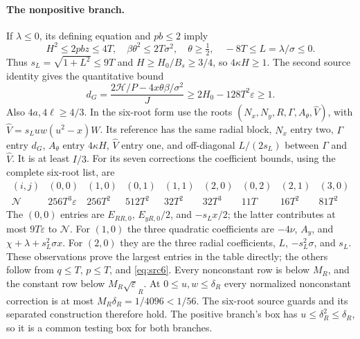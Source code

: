 \documentclass[11pt]{article}
\newcommand{\eps}{\varepsilon}
\newcommand{\sigs}{\sigma}
\begin{document}
\paragraph{The nonpositive branch.}
If $\lambda\le0$, its defining equation and $pb\le2$ imply
\[
 H^2\le2pbz\le4T,\quad \beta\theta^2\le2T\sigs^2,
 \quad \theta\ge\tfrac12,\quad -8T\le L=\lambda/\sigs\le0.
\]
Thus $s_L=\sqrt{1+L^2}\le9T$ and
$H\ge H_0/B_s\ge3/4$, so $4\kappa H\ge1$.
The second source identity gives the quantitative bound
\[
 d_G=\frac{2\mathcal H/P-4x\theta\beta/\sigs^2}{J}
       \ge 2H_0-128T^2\eps\ge1.
\]
Also $4a,4\ell\ge4/3$. In the six-root form use the roots
$(N_x,N_y,R,\Gamma,A_\theta,\widehat V)$, with
$\widehat V=s_Luw(u^2-x)W$.
Its reference has the same radial block, $N_x$ entry two,
$\Gamma$ entry $d_G$, $A_\theta$ entry $4\kappa H$,
$\widehat V$ entry one, and off-diagonal $L/(2s_L)$ between
$\Gamma$ and $\widehat V$. It is at least $I/3$.
For its seven corrections the coefficient bounds, using the complete
six-root list, are
\[
\begin{array}{c|rrrrrrrr}
 (i,j)&(0,0)&(1,0)&(0,1)&(1,1)&(2,0)&(0,2)&(2,1)&(3,0)\\\hline
 \mathcal N&256T^3\eps&256T^2&512T^2&32T^2&32T^3&11T&16T^2&81T^2
\end{array}
\]
The $(0,0)$ entries are $E_{RR,0}$, $E_{yR,0}/2$, and
$-s_Lx/2$; the latter contributes at most $9T\eps$ to
$\mathcal N$. For $(1,0)$ the three quadratic coefficients are
$-4\nu$, $A_y$, and $\chi+\lambda+s_L^2\sigs x$.
For $(2,0)$ they are the three radial coefficients, $L$,
$-s_L^2\sigs$, and $s_L$. These observations prove the largest
entries in the table directly; the others follow from
$q\le T$, $p\le T$, and \eqref{eq:src6}.
Every nonconstant row is below $M_R$, and the constant row below
$M_R\sqrt\eps_R$. At $0\le u,w\le\delta_R$ every normalized
nonconstant correction is at most $M_R\delta_R=1/4096<1/56$.
The six-root source guards and its separated construction therefore
hold. The positive branch's box has $u\le\delta_R^2\le\delta_R$,
so it is a common testing box for both branches.
\end{document}
